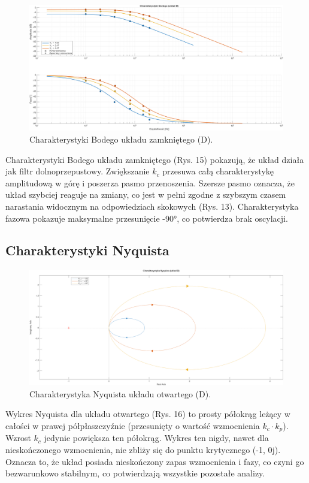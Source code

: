 \documentclass[12pt,a4paper]{article}
\begin{document}
	\begin{figure}[H]
		\centering
		\includegraphics[width=1\linewidth]{zdjecia/Bode_ukladD.png}
		\caption{Charakterystyki Bodego układu zamkniętego (D).}
		\label{fig:Bode_ukladD}
	\end{figure}
	
	Charakterystyki Bodego układu zamkniętego (Rys. 15) pokazują, że układ działa jak filtr dolnoprzepustowy. Zwiększanie $k_c$ przesuwa całą charakterystykę amplitudową w górę i poszerza pasmo przenoszenia. Szersze pasmo oznacza, że układ szybciej reaguje na zmiany, co jest w pełni zgodne z szybszym czasem narastania widocznym na odpowiedziach skokowych (Rys. 13). Charakterystyka fazowa pokazuje maksymalne przesunięcie -90°, co potwierdza brak oscylacji.
	
	\subsection{Charakterystyki Nyquista}
	
	\begin{figure}[H]
		\centering
		\includegraphics[width=0.8\linewidth]{zdjecia/NQ_ukladD.png}
		\caption{Charakterystyka Nyquista układu otwartego (D).}
		\label{fig:NQ_ukladD}
	\end{figure}
	
	Wykres Nyquista dla układu otwartego (Rys. 16) to prosty półokrąg leżący w całości w prawej półpłaszczyźnie (przesunięty o wartość wzmocnienia $k_c \cdot k_p$). Wzrost $k_c$ jedynie powiększa ten półokrąg. Wykres ten nigdy, nawet dla nieskończonego wzmocnienia, nie zbliży się do punktu krytycznego (-1, 0j). Oznacza to, że układ posiada nieskończony zapas wzmocnienia i fazy, co czyni go bezwarunkowo stabilnym, co potwierdzają wszystkie pozostałe analizy.
	
\end{document}
